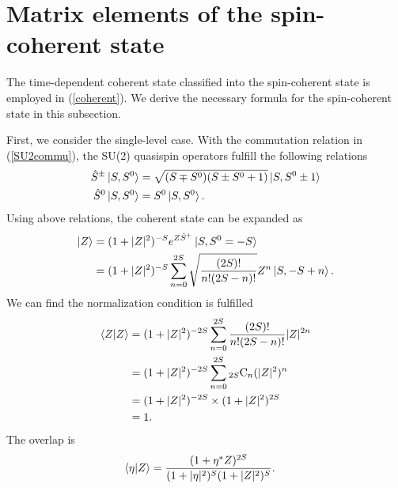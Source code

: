 \documentclass[11pt]{book} %
\begin{document}
\section{Matrix elements of the spin-coherent state}
\label{formula1}
The time-dependent coherent state classified into the spin-coherent state is employed in (\ref{coherent}). We derive the necessary formula for the spin-coherent state in this subsection. \par
First, we consider the single-level case.
With the commutation relation in (\ref{SU2commu}), the SU(2) quasispin operators fulfill the following relations
\begin{align}
  \hat{S}^{\pm}\ket{S,S^0} &= \sqrt{(S\mp S^0)(S\pm S^0+1)} \ket{S,S^0\pm 1}
  \label{S_pm} \\
  \hat{S}^0\ket{S,S^0} &= S^0\ket{S,S^0} .
\end{align}
Using above relations, the coherent state can be expanded as 
\begin{align}
  \ket{Z} &= (1+|Z|^2)^{-S}e^{Z \hat{S}^+}\ket{S,S^0=-S} \nonumber \\
  &= (1+|Z|^2)^{-S}\sum_{n=0}^{2S}\sqrt{\frac{(2S)!}{n!(2S-n)!}}Z^n\ket{S,-S+n} .
\end{align}
We can find the normalization condition is fulfilled
\begin{align}
  \braket{Z|Z} &= (1+|Z|^2)^{-2S}\sum_{n=0}^{2S}\frac{(2S)!}{n!(2S-n)!}|Z|^{2n} \nonumber \\
  &= (1+|Z|^2)^{-2S}\sum_{n=0}^{2S} {}_{2S}\mathrm{C}_n(|Z|^2)^n \nonumber \\
  &= (1+|Z|^2)^{-2S}\times(1+|Z|^2)^{2S} \nonumber \\
  &= 1 .
\end{align}
The overlap is
\begin{align}
  \braket{\eta|Z} &= \frac{(1+\eta^*Z)^{2S}}{(1+|\eta|^2)^S(1+|Z|^2)^S} .
\end{align}
\end{document}
